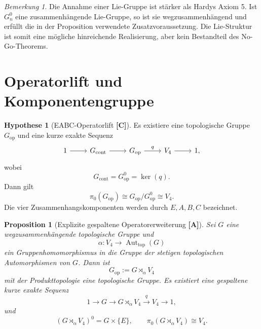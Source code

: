 \documentclass[11pt,a4paper,reqno]{amsart}
\newtheorem{proposition}[theorem]{Proposition}
\theoremstyle{definition}
\newtheorem{hypothesis}[theorem]{Hypothese}
\theoremstyle{remark}
\newtheorem{remark}[theorem]{Bemerkung}
\newcommand{\Aut}{\operatorname{Aut}}
\newcommand{\StatusA}{\textnormal{\textbf{[A]}}}
\newcommand{\StatusC}{\textnormal{\textbf{[C]}}}
\begin{document}
\begin{remark}
Die Annahme einer Lie-Gruppe ist stärker als Hardys Axiom 5. Ist $G_n^0$ eine zusammenhängende Lie-Gruppe, so ist sie wegzusammenhängend und erfüllt die in der Proposition verwendete Zusatzvoraussetzung. Die Lie-Struktur ist somit eine mögliche hinreichende Realisierung, aber kein Bestandteil des No-Go-Theorems.
\end{remark}

\section{Operatorlift und Komponentengruppe}

\begin{hypothesis}[EABC-Operatorlift \StatusC]
\label{hyp:operator-lift}
Es existiere eine topologische Gruppe $G_{\mathrm{op}}$ und eine kurze exakte Sequenz
\begin{equation}
\begin{tikzcd}
1 \arrow[r]
& G_{\mathrm{cont}} \arrow[r]
& G_{\mathrm{op}} \arrow[r,"q"]
& V_4 \arrow[r]
& 1,
\end{tikzcd}
\end{equation}
wobei
\begin{equation}
G_{\mathrm{cont}}=G_{\mathrm{op}}^0=\ker(q).
\end{equation}
Dann gilt
\begin{equation}
\pi_0(G_{\mathrm{op}})
\cong
G_{\mathrm{op}}/G_{\mathrm{op}}^0
\cong V_4.
\end{equation}
Die vier Zusammenhangskomponenten werden durch $E,A,B,C$ bezeichnet.
\end{hypothesis}

\begin{proposition}[Explizite gespaltene Operatorerweiterung \StatusA]
\label{prop:semidirect}
Sei $G$ eine wegzusammenhängende topologische Gruppe und
\begin{equation}
\alpha:V_4\longrightarrow\Aut_{\mathrm{top}}(G)
\end{equation}
ein Gruppenhomomorphismus in die Gruppe der stetigen topologischen Automorphismen von $G$. Dann ist
\begin{equation}
G_{\mathrm{op}}:=G\rtimes_\alpha V_4
\end{equation}
mit der Produkttopologie eine topologische Gruppe. Es existiert eine gespaltene kurze exakte Sequenz
\begin{equation}
1\longrightarrow G
\longrightarrow G\rtimes_\alpha V_4
\xrightarrow{\ q\ }V_4
\longrightarrow1,
\end{equation}
und
\begin{equation}
(G\rtimes_\alpha V_4)^0=G\times\{E\},
\qquad
\pi_0(G\rtimes_\alpha V_4)\cong V_4.
\end{equation}
\end{proposition}
\end{document}
